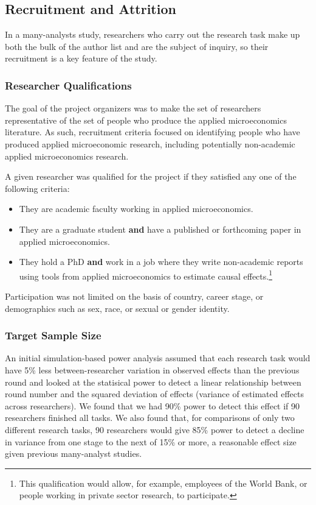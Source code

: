 \documentclass[
  letterpaper,
  DIV=11,
  numbers=noendperiod]{scrartcl}
\begin{document}
\subsection{Recruitment and Attrition}\label{recruitment-and-attrition}

In a many-analysts study, researchers who carry out the research task
make up both the bulk of the author list and are the subject of inquiry,
so their recruitment is a key feature of the study.

\subsubsection{Researcher
Qualifications}\label{researcher-qualifications}

The goal of the project organizers was to make the set of researchers
representative of the set of people who produce the applied
microeconomics literature. As such, recruitment criteria focused on
identifying people who have produced applied microeconomic research,
including potentially non-academic applied microeconomics research.

A given researcher was qualified for the project if they satisfied any
one of the following criteria:

\begin{itemize}
\item
  They are academic faculty working in applied microeconomics.
\item
  They are a graduate student \textbf{and} have a published or
  forthcoming paper in applied microeconomics.
\item
  They hold a PhD \textbf{and} work in a job where they write
  non-academic reports using tools from applied microeconomics to
  estimate causal effects.\footnote{This qualification would allow, for
    example, employees of the World Bank, or people working in private
    sector research, to participate.}
\end{itemize}

Participation was not limited on the basis of country, career stage, or
demographics such as sex, race, or sexual or gender identity.

\subsubsection{Target Sample Size}\label{sec-target-sample}

An initial simulation-based power analysis assumed that each research
task would have 5\% less between-researcher variation in observed
effects than the previous round and looked at the statisical power to
detect a linear relationship between round number and the squared
deviation of effects (variance of estimated effects across researchers).
We found that we had 90\% power to detect this effect if 90 researchers
finished all tasks. We also found that, for comparisons of only two
different research tasks, 90 researchers would give 85\% power to detect
a decline in variance from one stage to the next of 15\% or more, a
reasonable effect size given previous many-analyst studies.
\end{document}
